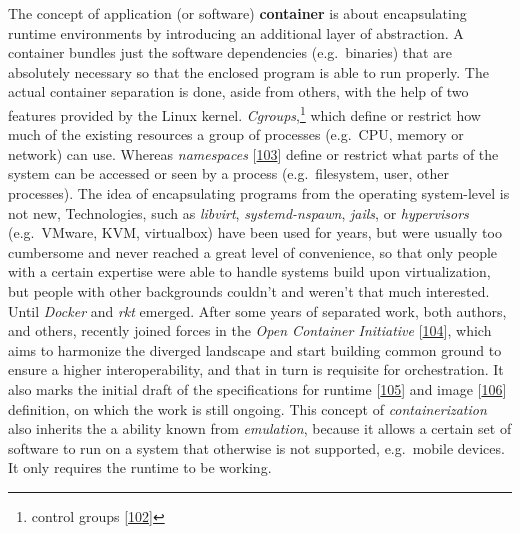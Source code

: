\documentclass[12pt,english,a4paper,titlepage,cleardoublepage=empty,dottedtoc]{report}
\begin{document}
The concept of application (or software) \textbf{container} is about
encapsulating runtime environments by introducing an additional layer of
abstraction. A container bundles just the software dependencies
(e.g.~binaries) that are absolutely necessary so that the enclosed
program is able to run properly. The actual container separation is
done, aside from others, with the help of two features provided by the
Linux kernel. \emph{Cgroups},\footnote{control groups
  {[}\protect\hyperlink{ref-web_2015_cgroup-doc}{102}{]}} which define
or restrict how much of the existing resources a group of processes
(e.g.~CPU, memory or network) can use. Whereas \emph{namespaces}
{[}\protect\hyperlink{ref-web_2016_kernel-namespace}{103}{]} define or
restrict what parts of the system can be accessed or seen by a process
(e.g.~filesystem, user, other processes). The idea of encapsulating
programs from the operating system-level is not new, Technologies, such
as \emph{libvirt}, \emph{systemd-nspawn}, \emph{jails}, or
\emph{hypervisors} (e.g.~VMware, KVM, virtualbox) have been used for
years, but were usually too cumbersome and never reached a great level
of convenience, so that only people with a certain expertise were able
to handle systems build upon virtualization, but people with other
backgrounds couldn't and weren't that much interested. Until
\emph{Docker} and \emph{rkt} emerged. After some years of separated
work, both authors, and others, recently joined forces in the \emph{Open
Container Initiative}
{[}\protect\hyperlink{ref-web_2016_open-container-initiative}{104}{]},
which aims to harmonize the diverged landscape and start building common
ground to ensure a higher interoperability, and that in turn is
requisite for orchestration. It also marks the initial draft of the
specifications for runtime
{[}\protect\hyperlink{ref-web_oci-spec_runtime}{105}{]} and image
{[}\protect\hyperlink{ref-web_oci-spec_image}{106}{]} definition, on
which the work is still ongoing. This concept of \emph{containerization}
also inherits the a ability known from \emph{emulation}, because it
allows a certain set of software to run on a system that otherwise is
not supported, e.g.~mobile devices. It only requires the runtime to be
working.
\end{document}
